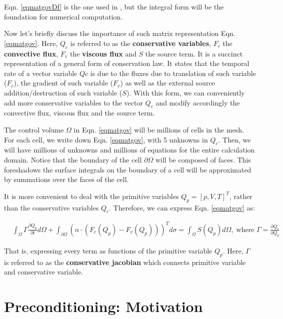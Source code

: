 \documentclass[12pt, letterpaper]{report}
\begin{document}
Eqn. \ref{eqmatgovDf} is the one used in \cite{li2006unified}, but the integral form will be the
foundation for numerical computation. \paraspace 

Now let's briefly discuss the importance of such matrix representation Eqn. \ref{eqmatgov}. Here,
$Q_c$ is referred to as the {\bf conservative variables}, $F_c$ the {\bf convective flux}, $F_v$ the
{\bf viscous flux} and $S$ the source term. It is a succinct representation of a general form of
conservation law. It states that the temporal rate of a vector variable $Qc$  is due to the fluxes
due to translation of such variable ($F_c$), the gradient of such variable ($F_v$) as well as the
external source addition/destruction of such variable ($S$). With this form, we can conveniently add
more conservative variables to the vector $Q_c$ and modify accordingly the convective flux, viscous
flux and the source term. \paraspace

The control volume $\Omega$ in Eqn. \ref{eqmatgov} will be millions of cells in the mesh. For each
cell, we write down Eqn. \ref{eqmatgov}, with 5 unknowns in $Q_c$. Then, we will have millions of
unknowns and millions of equations for the entire calculation domain. Notice that the boundary of
the cell $\partial \Omega$ will be composed of faces. This foreshadows the surface integrals on the
boundary of a cell will be approximated by summations over the faces of the cell. \paraspace

It is more convenient to deal with the primitive variables $Q_p = [p, V, T]^T$, rather than the
conservative variables $Q_c$. Therefore, we can express Eqn. \ref{eqmatgov} as:

\begin{align}\label{eqgovready}
   &\int_{\Omega}\Gamma \frac{\partial Q_p}{\partial t}d\Omega + \int_{\partial \Omega} (n \cdot
   (F_c(Q_p) - F_v(Q_p)))^T d\sigma = \int_{\Omega} S(Q_p) d\Omega, \; \textrm{where }\Gamma = \frac{\partial Q_c}{\partial Q_p}
\end{align}

That is, expressing every term as functions of the primitive variable $Q_p$. Here, $\Gamma$ is referred
to as the {\bf conservative jacobian} which connects primitive variable and conservative variable.
\paraspace

\clearpage
\section{Preconditioning: Motivation}
\end{document}
